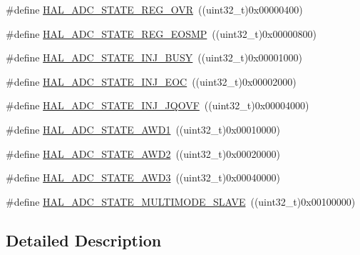 \begin{DoxyCompactItemize}
\item 
\#define \hyperlink{group___a_d_c___exported___types_ga1f99cd51b6636d9f60bc68dacb01eb10}{H\-A\-L\-\_\-\-A\-D\-C\-\_\-\-S\-T\-A\-T\-E\-\_\-\-R\-E\-G\-\_\-\-O\-V\-R}~((uint32\-\_\-t)0x00000400)
\item 
\#define \hyperlink{group___a_d_c___exported___types_ga28309e91f810694b13b5035f4ff698ce}{H\-A\-L\-\_\-\-A\-D\-C\-\_\-\-S\-T\-A\-T\-E\-\_\-\-R\-E\-G\-\_\-\-E\-O\-S\-M\-P}~((uint32\-\_\-t)0x00000800)
\item 
\#define \hyperlink{group___a_d_c___exported___types_ga0044d240de80a70923b5c970d19ba24b}{H\-A\-L\-\_\-\-A\-D\-C\-\_\-\-S\-T\-A\-T\-E\-\_\-\-I\-N\-J\-\_\-\-B\-U\-S\-Y}~((uint32\-\_\-t)0x00001000)
\item 
\#define \hyperlink{group___a_d_c___exported___types_gafcfffd11ab8b84d3b0a1ce50ccf821d5}{H\-A\-L\-\_\-\-A\-D\-C\-\_\-\-S\-T\-A\-T\-E\-\_\-\-I\-N\-J\-\_\-\-E\-O\-C}~((uint32\-\_\-t)0x00002000)
\item 
\#define \hyperlink{group___a_d_c___exported___types_ga0e29888675cbdd18e461fcd7711a2ad4}{H\-A\-L\-\_\-\-A\-D\-C\-\_\-\-S\-T\-A\-T\-E\-\_\-\-I\-N\-J\-\_\-\-J\-Q\-O\-V\-F}~((uint32\-\_\-t)0x00004000)
\item 
\#define \hyperlink{group___a_d_c___exported___types_ga39ce295171a5e608097017fda4cfd7d5}{H\-A\-L\-\_\-\-A\-D\-C\-\_\-\-S\-T\-A\-T\-E\-\_\-\-A\-W\-D1}~((uint32\-\_\-t)0x00010000)
\item 
\#define \hyperlink{group___a_d_c___exported___types_gae6e9712c706ca7f2998dfb5cf776b48f}{H\-A\-L\-\_\-\-A\-D\-C\-\_\-\-S\-T\-A\-T\-E\-\_\-\-A\-W\-D2}~((uint32\-\_\-t)0x00020000)
\item 
\#define \hyperlink{group___a_d_c___exported___types_gaa43e91fedb9ce41e36bc78ced4f3912e}{H\-A\-L\-\_\-\-A\-D\-C\-\_\-\-S\-T\-A\-T\-E\-\_\-\-A\-W\-D3}~((uint32\-\_\-t)0x00040000)
\item 
\#define \hyperlink{group___a_d_c___exported___types_ga24f867061abe6ee31227ec21289c69db}{H\-A\-L\-\_\-\-A\-D\-C\-\_\-\-S\-T\-A\-T\-E\-\_\-\-M\-U\-L\-T\-I\-M\-O\-D\-E\-\_\-\-S\-L\-A\-V\-E}~((uint32\-\_\-t)0x00100000)
\end{DoxyCompactItemize}


\subsection{Detailed Description}


